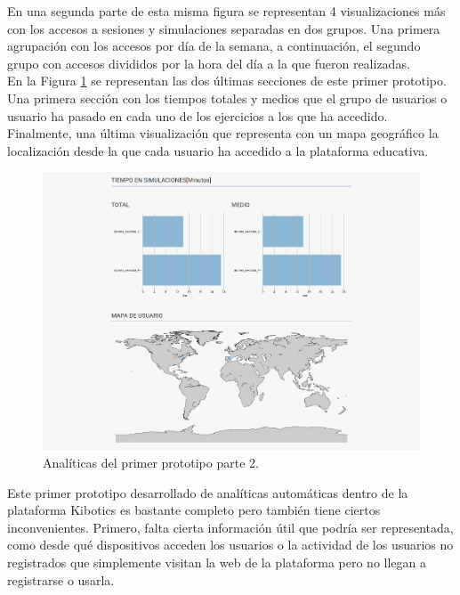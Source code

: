 \documentclass[a4paper, 12pt]{book}
\begin{document}
		En una segunda parte de esta misma figura se representan 4 visualizaciones más con los accesos a sesiones y simulaciones separadas en dos grupos. Una primera agrupación con los accesos por día de la semana, a continuación, el segundo grupo con accesos divididos por la hora del día a la que fueron realizadas.\\
		
		En la Figura \ref{fig:primer_prototipo_2} se representan las dos últimas secciones de este primer prototipo. Una primera sección con los tiempos totales y medios que el grupo de usuarios o usuario ha pasado en cada uno de los ejercicios a los que ha accedido. Finalmente, una última visualización que representa con un mapa geográfico la localización desde la que cada usuario ha accedido a la plataforma educativa.\\
		
		\begin{figure}[H]
			\centering
			\includegraphics[width=17cm, keepaspectratio]{img/primer_prototipo_2.png}
			\caption{Analíticas del primer prototipo parte 2.}
			\label{fig:primer_prototipo_2}
		\end{figure}
		
		Este primer prototipo desarrollado de analíticas automáticas dentro de la plataforma Kibotics es bastante completo pero también tiene ciertos inconvenientes. Primero, falta cierta información útil que podría ser representada, como desde qué dispositivos acceden los usuarios o la actividad de los usuarios no registrados que simplemente visitan la web de la plataforma pero no llegan a registrarse o usarla.\\
		
\end{document}
